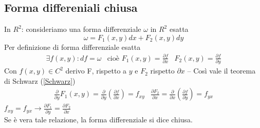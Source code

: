 \documentclass{book}
\begin{document}
\subsection{Forma differeniali chiusa}
In $R^2$: consideriamo una forma differenziale $\omega$ in $R^2$ esatta
\begin{equation*}
	\omega=F_1(x,y)dx+F_2(x,y)dy
\end{equation*}
Per definizione di forma differenziale esatta
\begin{eqnarray*}
	\exists f(x,y):df=\omega& \text{cioè } F_1(x,y)=\frac{\partial f}{\partial
	x} & F_2(x,y)=\frac{\partial f}{\partial y}
\end{eqnarray*}
Con $f(x,y)\in C^2$ derivo F, rispetto a $y$ e $F_2$ rispetto $\partial x$ -- 
Così vale il teorema di Schwarz (\ref{Schwarz})
\begin{eqnarray*}
	\frac{\partial}{\partial y}F_1(x,y)=\frac{\partial}{\partial
	y}\left(\frac{\partial f}{\partial x}\right) =f_{xy} &\frac{\partial
	F_2}{\partial x}=\frac{\partial}{\partial x} \left(\frac{\partial
	f}{\partial y}\right)=f_{yx}
\end{eqnarray*}
$f_{xy}=f_{yx}\to \frac{\partial F_1}{\partial y}=\frac{\partial F_2}{\partial
x}$ \\
Se è vera tale relazione, la forma differenziale si dice {\color{red}chiusa}.
\end{document}
